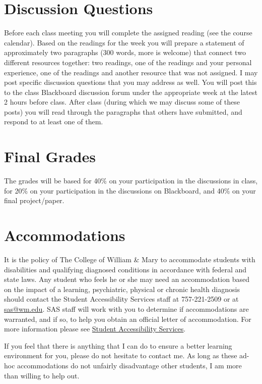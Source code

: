 \documentclass{article}
\begin{document}
\section{Discussion Questions}
Before each class meeting you will complete the assigned reading (see the course calendar). Based on the readings for the week you will prepare a statement of approximately two paragraphs (300 words, more is welcome) that connect two different resources together: two readings, one of the readings and your personal experience, one of the readings and another resource that was not assigned. I may post specific discussion questions that you may address as well. You will post this to the class Blackboard discussion forum under the appropriate week at the latest 2 hours before class. After class (during which we may discuss some of these posts) you will read through the paragraphs that others have submitted, and respond to at least one of them.

\section{Final Grades}
The grades will be based for 40\% on your participation in the discussions in class, for 20\% on your participation in the discussions on Blackboard, and 40\% on your final project/paper.

\section{Accommodations}
It is the policy of The College of William & Mary to accommodate students with disabilities and qualifying diagnosed conditions in accordance with federal and state laws. Any student who feels he or she may need an accommodation based on the impact of a learning, psychiatric, physical or chronic health diagnosis should contact the Student Accessibility Services staff at 757-221-2509 or at \href{mailto:sas@wm.edu}{sas@wm.edu}. SAS staff will work with you to determine if accommodations are warranted, and if so, to help you obtain an official letter of accommodation. For more information please see \href{http://www.wm.edu/sas}{Student Accessibility Services}.

If you feel that there is anything that I can do to ensure a better learning environment for you, please do not hesitate to contact me. As long as these ad-hoc accommodations do not unfairly disadvantage other students, I am more than willing to help out.
\end{document}
